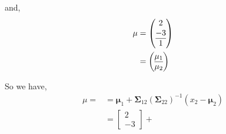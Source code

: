 \documentclass[12pt]{article}\usepackage[]{graphicx}\usepackage[]{color}
\newenvironment{problem}[2][Problem]{\begin{trivlist}
\item[\hskip \labelsep {\bfseries #1}\hskip \labelsep {\bfseries #2.}]}{\end{trivlist}}
\newcommand{\vct}{\mathbf}
\begin{document}
\begin{enumerate}[a)]
and,
\begin{align*}
\vct{\mu} &= \left(\begin{array}{@{}c@{}}
    2 \\
    -3 \\\hline
    1
  \end{array}\right)\\
&= \left(\begin{array}{@{}c@{}}
    \vct{\mu}_1 \\\hline
    \vct{\mu}_2
  \end{array}\right)
\end{align*}


So we have,
\begin{align*}
\mu = &= \vct{\mu}_1 + \vct{\Sigma}_{12}(\vct{\Sigma}_{22})^{-1}(x_2 - \vct{\mu}_2)\\
&= \begin{bmatrix} 2 \\ -3 \end{bmatrix} + 
\end{align*}

\end{enumerate}

\begin{problem}{4.6}
\end{problem}

\begin{problem}{4.7}
\end{problem}

\begin{problem}{4.10}
\end{problem}

\begin{problem}{4.11}
\end{problem}

\begin{problem}{4.12}
\end{problem}

\begin{problem}{4.13}
\end{problem}

\begin{problem}{4.14}
\end{problem}

\begin{problem}{4.15}
\end{problem}

\begin{problem}{4.16}
\end{problem}

\begin{problem}{4.17}
\end{problem}

\begin{problem}{4.18}
\end{problem}

\begin{problem}{4.19}
\end{problem}

\begin{problem}{4.20}
\end{problem}

\begin{problem}{4.21}
\end{problem}
\end{document}
